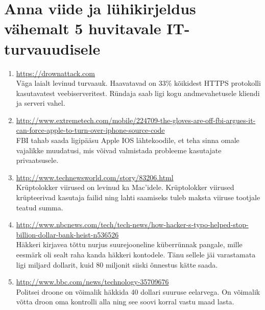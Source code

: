 \documentclass{article}
\begin{document}
\section{Anna viide ja lühikirjeldus vähemalt 5 huvitavale IT-turvauudisele}
\begin{enumerate}
	\item{\url{https://drownattack.com}\\
		Väga laialt levinud turvaauk. Haavatavad on 33\% kõikidest HTTPS protokolli kasutavatest veebiserveritest. 
		Ründaja saab ligi kogu andmevahetusele kliendi ja serveri vahel.}
	\item{\url{http://www.extremetech.com/mobile/224709-the-gloves-are-off-fbi-argues-it-can-force-apple-to-turn-over-iphone-source-code}\\
		FBI tahab saada ligipääsu Apple IOS lähtekoodile, et teha sinna omale vajalikke muudatusi, mis võivad valmistada probleeme kasutajate privaatsusele.}
	\item{\url{http://www.technewsworld.com/story/83206.html}\\
		Krüptolokker viirused on levinud ka Mac'idele. Krüptolokker viirused krüpteerivad kasutaja failid ning lahti saamiseks tuleb maksta viiruse tootjale teatud summa.}
	\item{\url{http://www.nbcnews.com/tech/tech-news/how-hacker-s-typo-helped-stop-billion-dollar-bank-heist-n536526}\\
		Häkkeri kirjavea tõttu nurjus suurejooneline küberrünnak pangale, mille eesmärk oli sealt raha kanda häkkeri kontodele. Tänu sellele jäi varastamata ligi miljard dollarit, kuid 80 miljonit siiski õnnestus kätte saada.}
	\item{\url{http://www.bbc.com/news/technology-35709676}\\
		Politsei droone on võimalik häkkida 40 dollari suuruse eelarvega. On võimalik võtta droon oma kontrolli alla ning see soovi korral vastu maad lasta.}
\end{enumerate}
\end{document}
